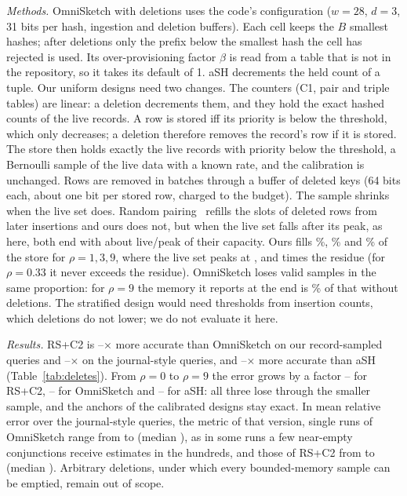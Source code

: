 \documentclass[sigconf,review,anonymous]{acmart}
\newcommand{\omni}{OmniSketch\xspace}
\begin{document}
\emph{Methods.} \omni with deletions uses the code's configuration ($w=28$, $d=3$, 31 bits per hash,
ingestion and deletion buffers). Each cell keeps the $B$ smallest hashes; after deletions only the
prefix below the smallest hash the cell has rejected is used. Its over-provisioning factor $\beta$ is
read from a table that is not in the repository, so it takes its default of 1. aSH decrements the held
count of a tuple. Our uniform designs need two changes. The counters (C1, pair and triple tables) are
linear: a deletion decrements them, and they hold the exact hashed counts of the live records. A row is
stored iff its priority is below the threshold, which only decreases; a deletion therefore removes the
record's row if it is stored. The store then holds exactly the live records with priority below the
threshold, a Bernoulli sample of the live data with a known rate, and the calibration is unchanged.
Rows are removed in batches through a buffer of deleted keys (64 bits each, about one bit per stored
row, charged to the budget). The sample shrinks when the live set does. Random pairing~\cite{gemulla}
refills the slots of deleted rows from later insertions and ours does not, but when the live set falls
after its peak, as here, both end with about live/peak of their capacity. Ours fills \NumDelHeldOne\%,
\NumDelHeldThree\% and \NumDelHeldNine\% of the store for $\rho=1,3,9$, where the live set peaks at
\NumDelPeakOne, \NumDelPeakThree{} and \NumDelPeakNine{} times the residue (for $\rho=0.33$ it never
exceeds the residue). \omni loses valid samples in the same proportion: for $\rho=9$ the memory it reports at the
end is \NumDelOmniMemNine\% of that without deletions. The stratified design would need thresholds from
insertion counts, which deletions do not lower; we do not evaluate it here.

\emph{Results.} RS+C2 is \NumDelROmniVsCalTwoLo--\NumDelROmniVsCalTwoHi$\times$ more accurate than
\omni on our record-sampled queries and \NumDelJOmniVsCalTwoLo--\NumDelJOmniVsCalTwoHi$\times$ on
the journal-style queries, and \NumDelRAshVsCalTwoLo--\NumDelRAshVsCalTwoHi$\times$ more accurate
than aSH (Table~\ref{tab:deletes}). From $\rho=0$ to $\rho=9$ the error grows by a factor
\NumDelRGrowthCalTwoLo--\NumDelRGrowthCalTwoHi{} for RS+C2, \NumDelRGrowthOmniLo--\NumDelRGrowthOmniHi{}
for \omni and \NumDelRGrowthAshLo--\NumDelRGrowthAshHi{} for aSH: all three lose through the smaller
sample, and the anchors of the calibrated designs stay exact. In mean relative error over the
journal-style queries, the metric of that version, single runs of \omni range from \NumDelMreOmniLo{} to
\NumDelMreOmniHi{} (median \NumDelMreOmniMed), as in some runs a few near-empty conjunctions receive
estimates in the hundreds, and those of RS+C2 from \NumDelMreCalTwoLo{} to \NumDelMreCalTwoHi{} (median
\NumDelMreCalTwoMed). Arbitrary deletions, under which every bounded-memory sample can be emptied,
remain out of scope.
\end{document}
